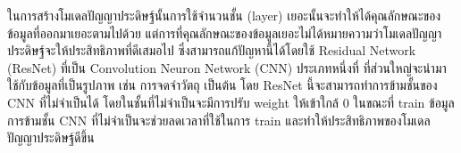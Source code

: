 ในการสร้างโมเดลปัญญาประดิษฐ์นั้นการใช้จำนวนชั้น (layer) เยอะนั้นจะทำให้ได้คุณลักษณะของข้อมูลที่ออกมาเยอะตามไปด้วย แต่การที่คุณลักษณะของข้อมูลเยอะไม่ได้หมายความว่าโมเดลปัญญาประดิษฐ์จะให้ประสิทธิภาพที่ดีเสมอไป ซึ่งสามารถแก้ปัญหานี้ได้โดยใช้ Residual Network (ResNet) ที่เป็น Convolution Neuron Network (CNN) ประเภทหนึ่งที่ ที่ส่วนใหญ่จะนำมาใช้กับข้อมูลที่เป็นรูปภาพ เช่น การจดจำวัตถุ เป็นต้น โดย ResNet นี้จะสามารถทำการข้ามชั้นของ CNN ที่ไม่จำเป็นได้ โดยในชั้นที่ไม่จำเป็นจะมีการปรับ weight ให้เข้าใกล้ 0 ในขณะที่ train ข้อมูล การข้ามชั้น CNN ที่ไม่จำเป็นจะช่วยลดเวลาที่ใช้ในการ train และทำให้ประสิทธิภาพของโมเดลปัญญาประดิษฐ์ดีขึ้น